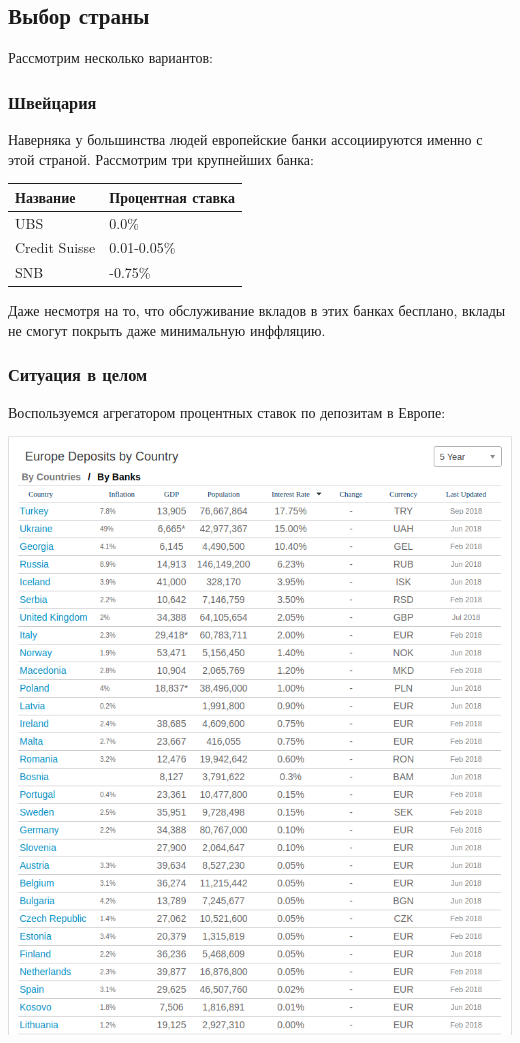 \subsection{Выбор страны}
Рассмотрим несколько вариантов:

\subsubsection{Швейцария}
Наверняка у большинства людей европейские банки ассоциируются именно с этой страной. Рассмотрим три крупнейших банка:

\begin{center}
	\begin{tabular}{ | l | l |}
		\hline
		Название & Процентная ставка \\ \hline
		UBS & 0.0\% \\ \hline
		Credit Suisse & 0.01-0.05\% \\ \hline
		SNB & -0.75\% \\ \hline
	\end{tabular}
\end{center}

Даже несмотря на то, что обслуживание вкладов в этих банках бесплано, вклады не смогут покрыть даже минимальную инффляцию.

\subsubsection{Ситуация в целом}
Воспользуемся агрегатором процентных ставок по депозитам в Европе:

\includegraphics[width=16cm]{pics/nikita/europ.png}

